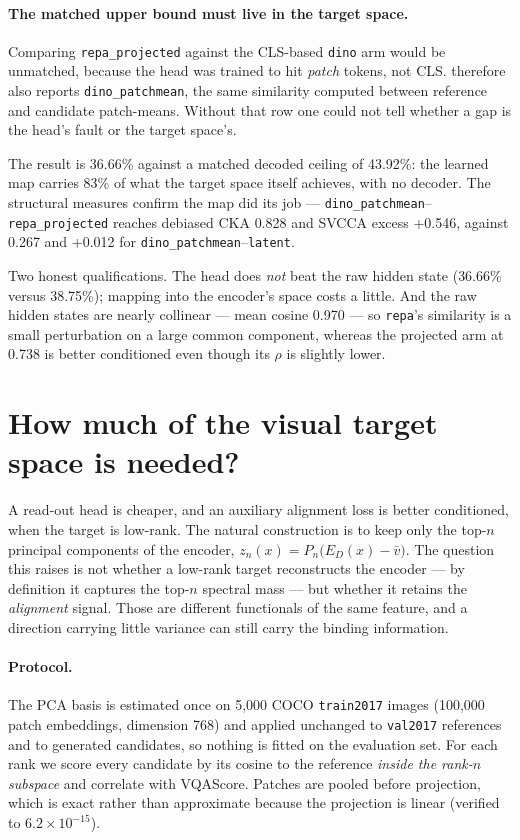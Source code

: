 \documentclass[10pt]{article}
\newcommand{\obs}[1]{\textcolor{observedblue}{#1}}
\begin{document}
\paragraph{The matched upper bound must live in the target space.}
Comparing \texttt{repa\_projected} against the CLS-based \texttt{dino} arm would be unmatched,
because the head was trained to hit \emph{patch} tokens, not CLS.  therefore also
reports \texttt{dino\_patchmean}, the same similarity computed between reference and candidate
patch-means. Without that row one could not tell whether a gap is the head's fault or the target
space's.

The result is \obs{36.66\%} against a matched decoded ceiling of \obs{43.92\%}: the learned map
carries \obs{83\%} of what the target space itself achieves, with no decoder. The structural
measures confirm the map did its job --- \texttt{dino\_patchmean}--\texttt{repa\_projected} reaches
debiased CKA \obs{0.828} and SVCCA excess \obs{+0.546}, against \obs{0.267} and \obs{+0.012} for
\texttt{dino\_patchmean}--\texttt{latent}.

Two honest qualifications. The head does \emph{not} beat the raw hidden state
(\obs{36.66\%} versus \obs{38.75\%}); mapping into the encoder's space costs a little. And the raw
hidden states are nearly collinear --- mean cosine \obs{0.970} --- so \texttt{repa}'s similarity is a
small perturbation on a large common component, whereas the projected arm at \obs{0.738} is better
conditioned even though its $\rho$ is slightly lower.

\section{How much of the visual target space is needed?}
\label{sec:rank}

A read-out head is cheaper, and an auxiliary alignment loss is better conditioned, when the target is
low-rank. The natural construction is to keep only the top-$n$ principal components of the encoder,
$z_n(x) = P_n\big(E_D(x) - \bar v\big)$. The question this raises is not whether a low-rank target
reconstructs the encoder --- by definition it captures the top-$n$ spectral mass --- but whether it
retains the \emph{alignment} signal. Those are different functionals of the same feature, and a
direction carrying little variance can still carry the binding information.

\paragraph{Protocol.}
The PCA basis is estimated once on \obs{5{,}000} COCO \texttt{train2017} images
(\obs{100{,}000} patch embeddings, dimension \obs{768}) and applied unchanged to \texttt{val2017}
references and to generated candidates, so nothing is fitted on the evaluation set. For each rank we
score every candidate by its cosine to the reference \emph{inside the rank-$n$ subspace} and
correlate with VQAScore. Patches are pooled before projection, which is exact rather than
approximate because the projection is linear (verified to \obs{$6.2\times10^{-15}$}).
\end{document}
